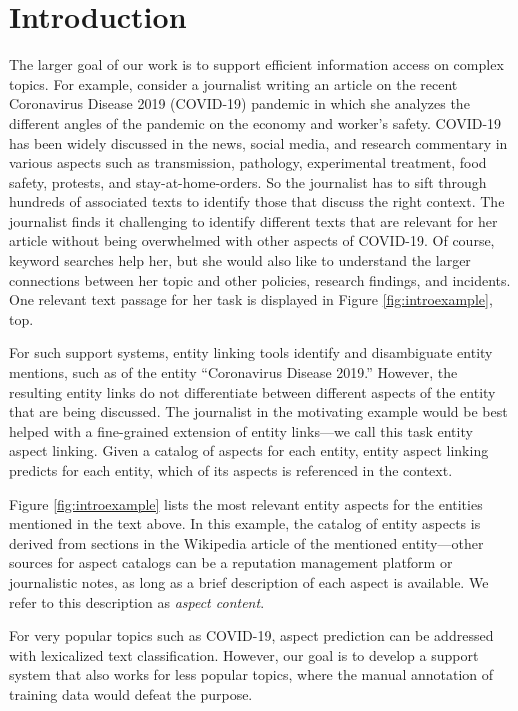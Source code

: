 \section{Introduction}
\label{sec:Introduction}


The larger goal of our work is to support efficient information access on complex topics. 
%
For example, consider a journalist writing an article on the recent Coronavirus Disease 2019 (COVID-19)
pandemic in which she analyzes the different angles of the pandemic on the economy and worker's safety. COVID-19 has been widely discussed in the news, social media, and research commentary in various aspects such as transmission, pathology, experimental treatment, food safety, protests, and stay-at-home-orders. So the journalist has to sift through hundreds of associated texts to identify those that discuss the right context. The journalist finds it challenging to identify different texts that are relevant for her article without being overwhelmed with other aspects of COVID-19. Of course, keyword searches help her, but she would also like to understand the larger connections between her topic and other policies, research findings, and incidents. One relevant text passage for her task is displayed in Figure \ref{fig:introexample}, top. 





For such support systems, entity linking tools \cite{ferragina2010tagme,mendes2011dbpedia,piccinno2014wat} identify and disambiguate entity mentions, such as of the entity ``Coronavirus Disease 2019.'' However, the resulting entity links do not differentiate between different aspects of the entity that are being discussed. The journalist in the motivating example would be best helped with a fine-grained extension of entity links---we call this task entity aspect linking. Given a catalog of aspects for each entity, entity aspect linking predicts for each entity, which of its aspects is referenced in the context. 

 Figure \ref{fig:introexample} lists the most relevant entity aspects for the entities mentioned in the text above.  In this example, the catalog of entity aspects is derived from sections in the Wikipedia article of the mentioned entity---other sources for aspect catalogs can be a reputation management platform or journalistic notes, as long as a brief description of each aspect is available. We refer to this description as \emph{aspect content}.  
 
 For very popular topics such as COVID-19, aspect prediction can be addressed with lexicalized text classification. However, our goal is to develop a support system that also works for less popular topics, where the manual annotation of training data would defeat the purpose. 

